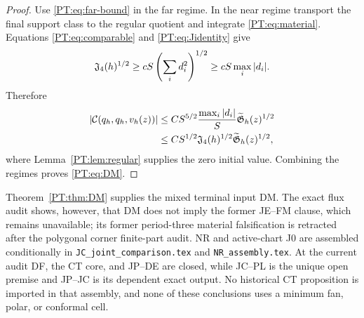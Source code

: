 \begin{proof}
Use \eqref{PT:eq:far-bound} in the far regime.  In the near regime transport
the final support class to the regular quotient and integrate
\eqref{PT:eq:material}.  Equations \eqref{PT:eq:comparable} and
\eqref{PT:eq:Jidentity} give
\[
 \mathfrak J_4(h)^{1/2}\ge cS\left(\sum_i d_i^2\right)^{1/2}
 \ge cS\max_i|d_i|.
\]
Therefore
\begin{align*}
 |\mathcal C(q_h,q_h,v_h(z))|
 &\le CS^{5/2}\frac{\max_i|d_i|}{S}
       \widetilde{\mathfrak G}_h(z)^{1/2}\\
 &\le CS^{1/2}\mathfrak J_4(h)^{1/2}\widetilde{\mathfrak G}_h(z)^{1/2},
\end{align*}
where Lemma~\ref{PT:lem:regular} supplies the zero initial value.  Combining
the regimes proves \eqref{PT:eq:DM}.
\end{proof}

\begin{corollary}\label{PT:cor:J0}
Theorem~\ref{PT:thm:DM} supplies the mixed terminal input DM.  The exact flux
audit shows, however, that DM does not imply the former JE--FM clause,
which remains unavailable; its former period-three material falsification
is retracted after the polygonal corner finite-part audit.  NR and active-chart J0 are
assembled conditionally in \texttt{JC\_joint\_comparison.tex} and
\texttt{NR\_assembly.tex}.  At the current audit DF, the CT core, and
JP--DE are closed, while JC--PL is the unique open premise and JP--JC is
its dependent exact output.  No historical CT
proposition is imported in that assembly, and none of these conclusions
uses a minimum fan, polar, or conformal cell.
\end{corollary}
\endgroup
